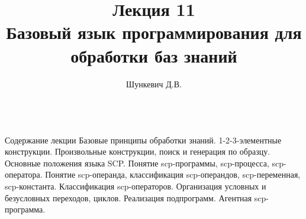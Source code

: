 \title{Лекция 11\\Базовый язык программирования для обработки баз знаний}
\author[]{Шункевич Д.В.}

\begin{frame}
	\titlepage
\end{frame}

\begin{frame}{\\Содержание лекции}
	\topline
	\justifying
	Базовые принципы обработки знаний. 1-2-3-элементные конструкции. Произвольные конструкции, поиск и генерация по образцу. Основные положения языка SCP. Понятие scp-программы, scp-процесса, scp-оператора. Понятие scp-операнда, классификация scp-операндов, scp-переменная, scp-константа. Классификация scp-операторов. Организация условных и безусловных переходов, циклов. Реализация подпрограмм. Агентная scp-программа.
\end{frame}